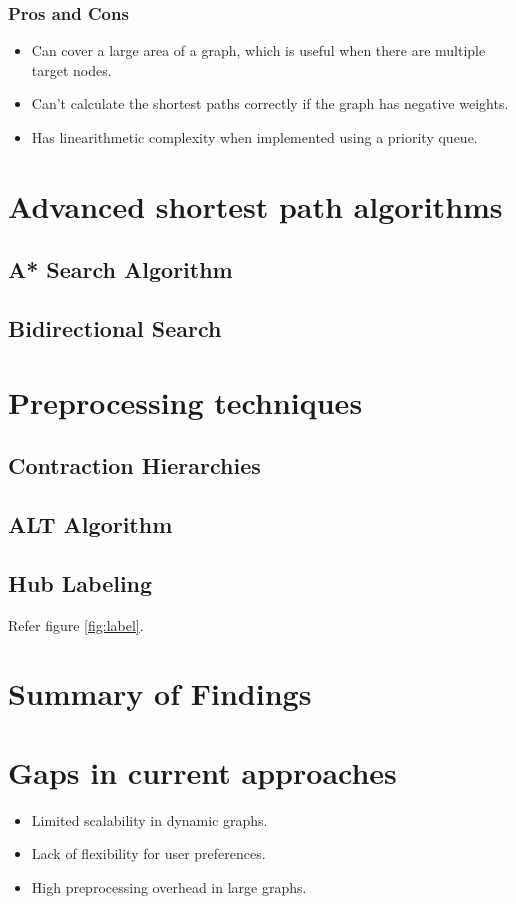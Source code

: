 		\subsubsection{Pros and Cons}
		\begin{itemize}
			\item Can cover a large area of a graph, which is useful when there are multiple target nodes.
			\item Can't calculate the shortest paths correctly if the graph has negative weights.
			\item Has linearithmetic complexity when implemented using a priority queue.
		\end{itemize}
		

\section{Advanced shortest path algorithms}
\subsection{A* Search Algorithm}
\subsection{Bidirectional Search}

\section{Preprocessing techniques}
\subsection{Contraction Hierarchies}
\subsection{ALT Algorithm}
\subsection{Hub Labeling}

Refer figure \ref{fig:label}.

\section{Summary of Findings}

\section{Gaps in current approaches}
	\begin{itemize}
		\item Limited scalability in dynamic graphs.
		\item Lack of flexibility for user preferences.
		\item High preprocessing overhead in large graphs.
	\end{itemize}

